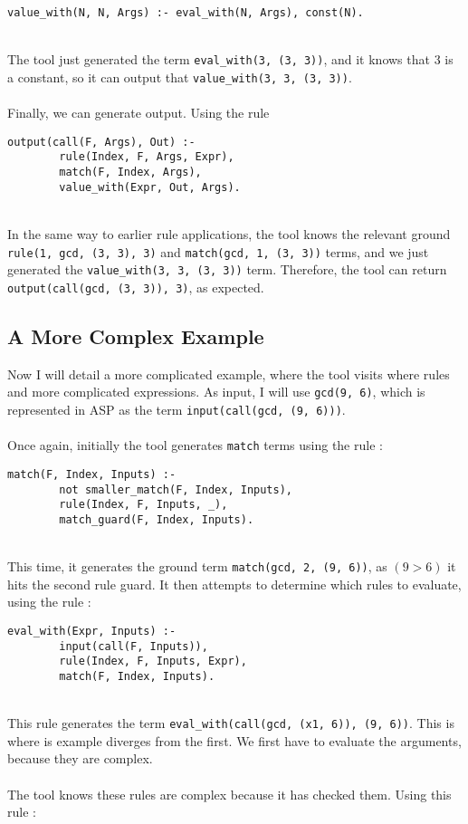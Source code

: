 \begin{lstlisting}[firstnumber=97]
value_with(N, N, Args) :- eval_with(N, Args), const(N).
\end{lstlisting}
\mbox{} \\
The tool just generated the term \lstinline{eval_with(3, (3, 3))}, and it knows that 3 is a constant, so it can output that \lstinline{value_with(3, 3, (3, 3))}. \\ \\
Finally, we can generate output. Using the rule \\

\begin{lstlisting}[firstnumber=55]
output(call(F, Args), Out) :- 
		rule(Index, F, Args, Expr), 
		match(F, Index, Args), 
		value_with(Expr, Out, Args).
\end{lstlisting}
\mbox{} \\
In the same way to earlier rule applications, the tool knows the relevant ground \lstinline{rule(1, gcd, (3, 3), 3)} and \lstinline{match(gcd, 1, (3, 3))} terms, and we just generated the \lstinline{value_with(3, 3, (3, 3))} term. Therefore, the tool can return \lstinline{output(call(gcd, (3, 3)), 3)}, as expected.

\subsection{A More Complex Example}
Now I will detail a more complicated example, where the tool visits where rules and more complicated expressions. As input, I will use \lstinline{gcd(9, 6)}, which is represented in ASP as the term \lstinline{input(call(gcd, (9, 6)))}. \\ \\
Once again, initially the tool generates \lstinline{match} terms using the rule : \\ %

\begin{lstlisting}[firstnumber=197]
match(F, Index, Inputs) :-
		not smaller_match(F, Index, Inputs), 
		rule(Index, F, Inputs, _), 
		match_guard(F, Index, Inputs).
\end{lstlisting}
\mbox{} \\
This time, it generates the ground term \lstinline{match(gcd, 2, (9, 6))}, as $(9 > 6)$ it hits the second rule guard. It then attempts to determine which rules to evaluate, using the rule : \\ %

\begin{lstlisting}[firstnumber=128]
eval_with(Expr, Inputs) :- 
		input(call(F, Inputs)), 
		rule(Index, F, Inputs, Expr), 
		match(F, Index, Inputs).
\end{lstlisting}
\mbox{} \\
This rule generates the term \lstinline!eval_with(call(gcd, (x1, 6)), (9, 6))!. This is where is example diverges from the first. We first have to evaluate the arguments, because they are complex. \\ \\
The tool knows these rules are complex because it has checked them. Using this rule : \\

